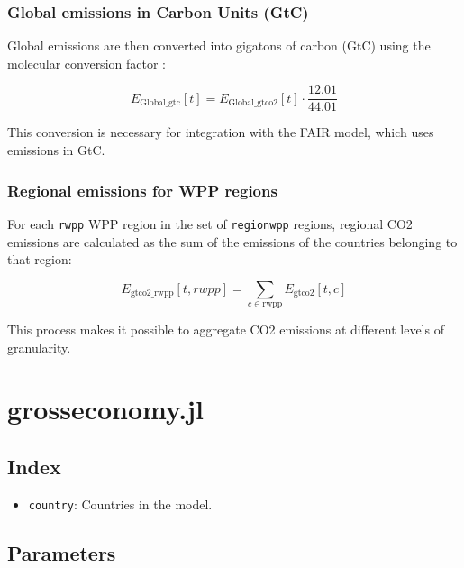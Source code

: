\documentclass[
]{article}
\providecommand{\tightlist}{%
  \setlength{\itemsep}{0pt}\setlength{\parskip}{0pt}}
\begin{document}
\subsubsection{Global emissions in Carbon Units
(GtC)}\label{global-emissions-in-carbon-units-gtc}

Global emissions are then converted into gigatons of carbon (GtC) using
the molecular conversion factor :

\begin{equation}
 E_{\text{Global\_gtc}}[t] = E_{\text{Global\_gtco2}}[t] \cdot \frac{12.01}{44.01} 
\end{equation}


This conversion is necessary for integration with the FAIR model, which
uses emissions in GtC.

\subsubsection{Regional emissions for WPP
regions}\label{regional-emissions-for-wpp-regions}

For each \texttt{rwpp} WPP region in the set of \texttt{regionwpp}
regions, regional CO2 emissions are calculated as the sum of the
emissions of the countries belonging to that region:

\begin{equation}
 E_{\text{gtco2\_rwpp}}[t,rwpp] = \sum_{c \in \text{rwpp}} E_{\text{gtco2}}[t,c] 
\end{equation}


This process makes it possible to aggregate CO2 emissions at different
levels of granularity.

\section{grosseconomy.jl}\label{grosseconomy.jl}

\subsection{Index}\label{index}

\begin{itemize}
\tightlist
\item
  \texttt{country}: Countries in the model.
\end{itemize}

\subsection{Parameters}\label{parameters-3}
\end{document}
